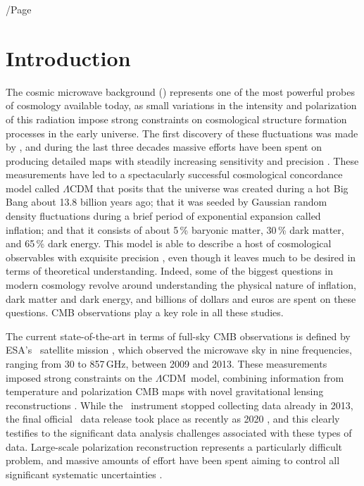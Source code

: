 /Page\documentclass[twocolumn]{aa}
\def\LCDM{$\Lambda$CDM}
\begin{document}
\tableofcontents

\section{Introduction}
\label{sec:introduction}

The cosmic microwave background () represents one of the most
powerful probes of cosmology available today, as small variations in
the intensity and polarization of this radiation impose strong
constraints on cosmological structure formation processes in the early
universe. The first discovery of these fluctuations was made by
\citet{smoot:1992}, and during the last three decades massive efforts
have been spent on producing detailed maps with steadily increasing
sensitivity and precision \citep[e.g.,][and references
  therein]{bennett2012,debernardis:2000,Louis:2017,Sievers:2013,ogburn:2010,
  planck2016-l01}. These measurements have led to a spectacularly
successful cosmological concordance model called $\Lambda$CDM that
posits that the universe was created during a hot Big Bang about 13.8
billion years ago; that it was seeded by Gaussian random density
fluctuations during a brief period of exponential expansion called
inflation; and that it consists of about 5\,\% baryonic matter, 30\,\%
dark matter, and 65\,\% dark energy. This model is able to describe a
host of cosmological observables with exquisite precision \citep[see
  e.g.][]{planck2016-l06}, even though it leaves much to be desired in
terms of theoretical understanding. Indeed, some of the biggest
questions in modern cosmology revolve around understanding the
physical nature of inflation, dark matter and dark energy, and
billions of dollars and euros are spent on these questions. CMB
observations play a key role in all these studies.

The current state-of-the-art in terms of full-sky CMB observations is
defined by ESA's \Planck\ satellite mission
\citep{planck2013-p01,planck2014-a01,planck2016-l01}, which observed
the microwave sky in nine frequencies, ranging from 30 to 857\,GHz,
between 2009 and 2013. These measurements imposed strong constraints
on the \LCDM\ model, combining information from temperature and
polarization CMB maps with novel gravitational lensing reconstructions
\citep{planck2016-l06}. While the \Planck\ instrument stopped
collecting data already in 2013, the final official \Planck\ data
release took place as recently as 2020 \citep{npipe}, and this
clearly testifies to the significant data analysis challenges
associated with these types of data. Large-scale polarization
reconstruction represents a particularly difficult problem, and
massive amounts of effort have been spent aiming to control all
significant systematic uncertainties
\citep[e.g.,][]{npipe,delouis:2019}.
\end{document}
